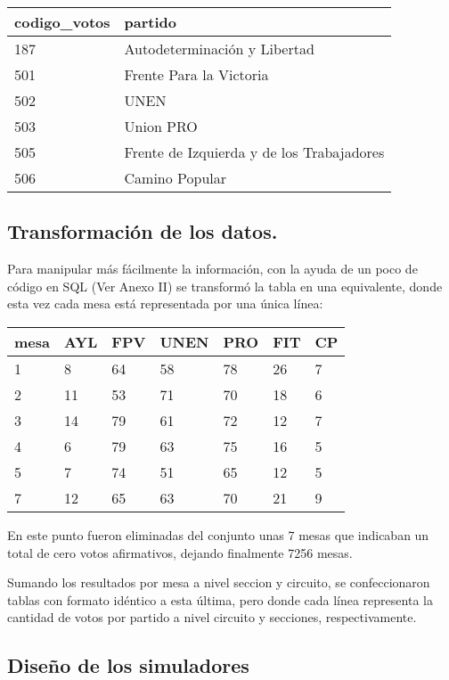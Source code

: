 \documentclass[12pt, a4paper]{article}
\begin{document}
\begin{center}
	\begin{tabular}{ll}
		codigo\_votos & partido \\ \hline
		   187 & Autodeterminaci\'on y Libertad\\
		   501 & Frente Para la Victoria \\
		   502 & UNEN \\
		   503 & Union PRO \\
		   505 & Frente de Izquierda y de los Trabajadores \\
		   506 & Camino Popular \\
	\end{tabular}
\end{center}
 
\subsection{Transformaci\'on de los datos.}

Para manipular m\'as f\'acilmente la informaci\'on, con la ayuda de un poco de c\'odigo en SQL (Ver Anexo II) se transform\'o la tabla en una equivalente, donde esta vez cada mesa est\'a representada por una \'unica l\'inea:

\begin{center}
	\begin{tabular}{l | llllll}
mesa & AYL & FPV & UNEN & PRO & FIT & CP \\ \hline
1 & 8 & 64 & 58 & 78 & 26 & 7 \\
2 & 11 & 53 & 71 & 70 & 18 & 6 \\
3 & 14 & 79 & 61 & 72 & 12 & 7 \\
4 & 6 & 79 & 63 & 75 & 16 & 5 \\
5 & 7 & 74 & 51 & 65 & 12 & 5 \\
7 & 12 & 65 & 63 & 70 & 21 & 9 \\
	\end{tabular}
\end{center}

En este punto fueron eliminadas del conjunto unas 7 mesas que indicaban un total de cero votos afirmativos, dejando finalmente 7256 mesas.

Sumando los resultados por mesa a nivel seccion y circuito, se confeccionaron tablas con formato id\'entico a esta \'ultima, pero donde cada l\'inea representa la cantidad de votos por partido a nivel circuito y secciones, respectivamente.

\subsection{Dise\~no de los simuladores}
\end{document}
